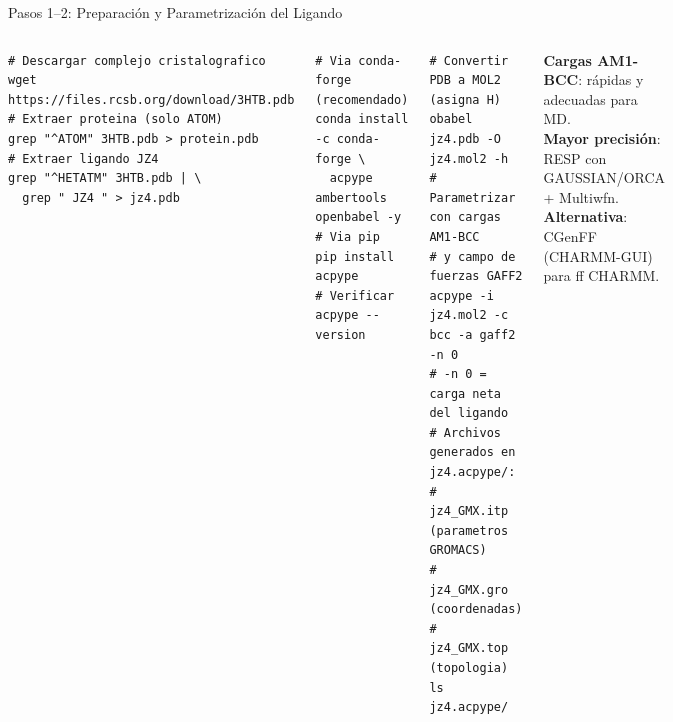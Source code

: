 \documentclass[aspectratio=169, 10pt]{beamer}
\begin{document}
\begin{frame}[fragile,shrink=5]{Pasos 1--2: Preparación y Parametrización del Ligando}
\begin{columns}[T]
\begin{tcolorbox}[definitionbox, title={1. Obtener PDB y separar ligando}]
\begin{lstlisting}[style=bashstyle]
# Descargar complejo cristalografico
wget https://files.rcsb.org/download/3HTB.pdb
# Extraer proteina (solo ATOM)
grep "^ATOM" 3HTB.pdb > protein.pdb
# Extraer ligando JZ4
grep "^HETATM" 3HTB.pdb | \
  grep " JZ4 " > jz4.pdb
\end{lstlisting}
\end{tcolorbox}
\vspace{0.3em}
\begin{tcolorbox}[warningbox, title={2. Instalar ACPYPE y AmberTools}]
\begin{lstlisting}[style=bashstyle]
# Via conda-forge (recomendado)
conda install -c conda-forge \
  acpype ambertools openbabel -y
# Via pip
pip install acpype
# Verificar
acpype --version
\end{lstlisting}
\end{tcolorbox}
\begin{tcolorbox}[formulabox, title={3. Generar parámetros GAFF2 (ACPYPE)}]
\begin{lstlisting}[style=bashstyle]
# Convertir PDB a MOL2 (asigna H)
obabel jz4.pdb -O jz4.mol2 -h
# Parametrizar con cargas AM1-BCC
# y campo de fuerzas GAFF2
acpype -i jz4.mol2 -c bcc -a gaff2 -n 0
# -n 0 = carga neta del ligando
# Archivos generados en jz4.acpype/:
#   jz4_GMX.itp  (parametros GROMACS)
#   jz4_GMX.gro  (coordenadas)
#   jz4_GMX.top  (topologia)
ls jz4.acpype/
\end{lstlisting}
\end{tcolorbox}
\begin{tcolorbox}[comparisonbox]
\small\textbf{Cargas AM1-BCC}: rápidas y adecuadas para MD.\\
\textbf{Mayor precisión}: RESP con GAUSSIAN/ORCA + Multiwfn.\\
\textbf{Alternativa}: CGenFF (CHARMM-GUI) para ff CHARMM.
\end{tcolorbox}
\end{columns}
\end{frame}
\end{document}
